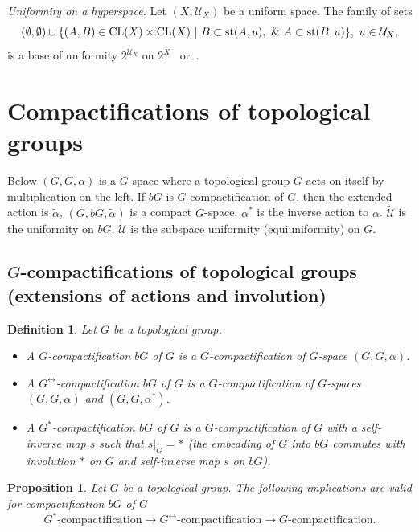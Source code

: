 \documentclass{amsart}
\newtheorem{pro}[thm]{Proposition}
\newtheorem{df}[thm]{Definition}
\newcommand{\st}{\mbox{{\rm st}}}
\newcommand{\CL}{\mbox{{\rm CL}}}
\begin{document}
{\it Uniformity on a hyperspace.} Let $(X, \mathcal U_X)$ be a uniform space. The family of sets
$$(\emptyset, \emptyset)\cup\{(A, B)\in\CL (X)\times\CL (X)\ |\ B\subset\st (A, u),\ \&\ A\subset\st (B, u)\},\ u\in\mathcal U_X,$$
is a base of uniformity $2^{\mathcal U_X}$ on $2^X$~\cite[Problem 8.5.16]{Engelking} or~\cite[Ch.\ 2,\ \S\ Hyperspace]{Isbell}.


\section{Compactifications of topological groups}\label{class}

Below $(G, G, \alpha)$ is a $G$-space where a topological group $G$ acts on itself by multiplication on the left. If $b G$ is $G$-compactification of $G$, then the extended action is $\tilde\alpha$, $(G, b G, \tilde\alpha)$ is a compact $G$-space. $\alpha^*$ is the inverse action to $\alpha$. $\tilde{\mathcal U}$ is the uniformity on $b G$, $\mathcal U$ is the subspace uniformity (equiuniformity) on $G$.

\subsection{$G$-compactifications of topological groups (extensions of actions and involution)}
\begin{df}
Let $G$ be a topological group. 
\begin{itemize}
\item A $G$-compactification $b G$ of $G$ is a $G$-compactification of $G$-space $(G, G, \alpha)$. 
\item A $G^{\leftrightarrow}$-compactification $b G$  of $G$ is a $G$-compactification of $G$-spaces $(G, G, \alpha)$ and $(G, G, \alpha^*)$. 
\item A $G^*$-compactification $b G$ of $G$ is a $G$-compactification of $G$ with a self-inverse map $s$ such that $s|_{G}=*$ {\rm(}the embedding of $G$ into $b G$ commutes with involution $*$ on $G$ and self-inverse map $s$ on $b G${\rm)}. 
\end{itemize}
\end{df}

\begin{pro}\label{compinv}
Let $G$ be a topological group. The following implications are valid for compactification $b G$ of $G$
$$G^*\mbox{-compactification}\longrightarrow G^{\leftrightarrow}\mbox{-compactification}\longrightarrow G\mbox{-compactification}.$$
\end{pro}
\end{document}
